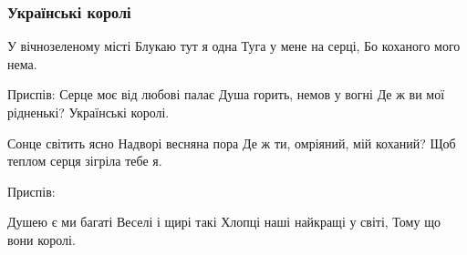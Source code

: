  
 
 

\subsubsection{Українські королі}

У вічнозеленому місті
Блукаю тут я одна
Туга у мене на серці,
Бо коханого мого нема.

Приспів:
Серце моє від любові палає
Душа горить, немов у вогні
Де ж ви мої рідненькі?
Українські королі.

Сонце світить ясно
Надворі весняна пора
Де ж ти, омріяний, мій коханий?
Щоб теплом серця зігріла тебе я.

Приспів:

Душею є ми багаті
Веселі і щирі такі
Хлопці наші найкращі у світі,
Тому що вони королі.
